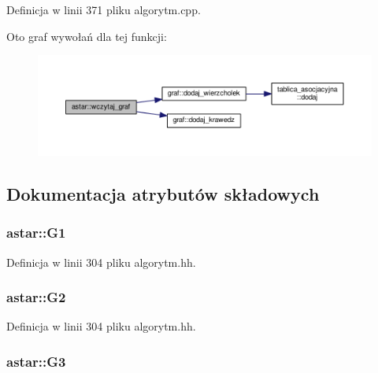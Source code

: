 Definicja w linii 371 pliku algorytm.\-cpp.



Oto graf wywołań dla tej funkcji\-:
\nopagebreak
\begin{figure}[H]
\begin{center}
\leavevmode
\includegraphics[width=350pt]{classastar_a49a57d782d6c8e45d52b8172de9599c3_cgraph}
\end{center}
\end{figure}




\subsection{Dokumentacja atrybutów składowych}
\hypertarget{classastar_a21539dac3fd18df6e15afc7c83d89427}{
\subsubsection[{G1}]{ astar\-::\-G1\hspace{0.3cm}{\ttfamily [private]}}}\label{classastar_a21539dac3fd18df6e15afc7c83d89427}


Definicja w linii 304 pliku algorytm.\-hh.

\hypertarget{classastar_aa835235b087f6ad57c96c1a7a94d2a62}{
\subsubsection[{G2}]{ astar\-::\-G2\hspace{0.3cm}{\ttfamily [private]}}}\label{classastar_aa835235b087f6ad57c96c1a7a94d2a62}


Definicja w linii 304 pliku algorytm.\-hh.

\hypertarget{classastar_a06c4202ba38c3eecf189388cf06b9b80}{
\subsubsection[{G3}]{ astar\-::\-G3\hspace{0.3cm}{\ttfamily [private]}}}\label{classastar_a06c4202ba38c3eecf189388cf06b9b80}


